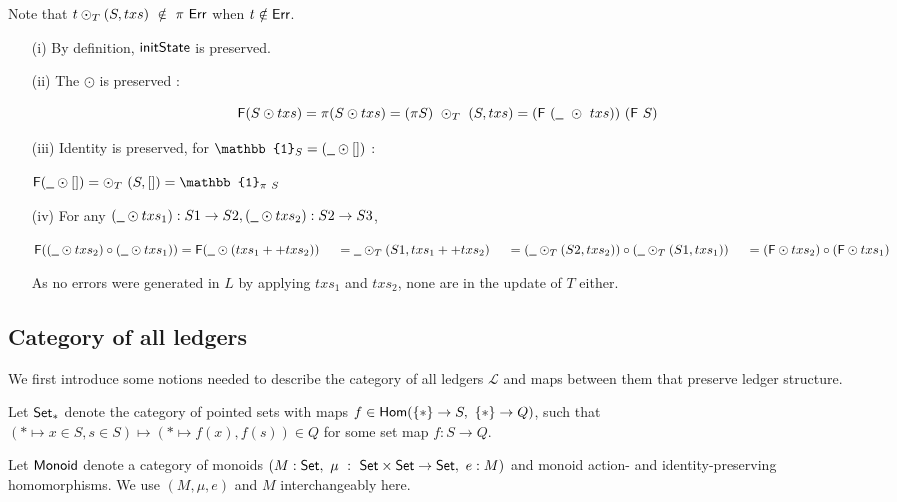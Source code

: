 Note that $t \odot_T (S, txs)~\notin~\pi~\mathsf{Err}$ when $t \notin \mathsf{Err}$.

\begin{itemize}
  \item[(i)] By definition, $\mathsf{initState}$ is preserved.

  \item[(ii)] The $\odot$ is preserved :

 \[ \mathsf{F} (S \odot txs) = \pi (S \odot txs) = (\pi S)~\odot_T~(S, txs) = (\mathsf{F}~(\wcard~\odot~txs))~(\mathsf{F}~S)~ \]

 \item[(iii)] Identity is preserved, for $\mathbb{1}_S = (\wcard \odot [])$ :

 $ \mathsf{F} (\wcard \odot []) = \odot_T~(S, []) = \mathbb{1}_{\pi~S}$ \newline

 \item[(iv)] For any $(\wcard \odot txs_1) : S1 \to S2, (\wcard \odot txs_2) : S2 \to S3$, \newline

 $ \mathsf{F} ((\wcard \odot txs_2) \circ (\wcard \odot txs_1)) = \mathsf{F} (\wcard \odot (txs_1 ++ txs_2)) \\
 ~~~~ = \wcard \odot_T (S1, txs_1 ++ txs_2) \\
 ~~~~ = (\wcard \odot_T (S2, txs_2)) \circ (\wcard \odot_T (S1, txs_1))  \\
 ~~~~ = (\mathsf{F} \odot txs_2) \circ (\mathsf{F} \odot txs_1)$ \newline

 As no errors were generated in $L$ by applying $txs_1$ and $txs_2$, none are in
 the update of $T$ either.
\end{itemize}


\subsection{Category of all ledgers}
\label{sec:all-ledgers}

We first introduce some notions needed to describe the category of all ledgers $\mathcal{L}$
and maps between them that preserve ledger structure.

Let $\mathsf{Set}_{*}$ denote the category of pointed sets with maps $f \in \mathsf{Hom} (\{*\} \to S,~\{*\} \to Q)$,
such that $({*} \mapsto x \in S, s \in S) \mapsto (* \mapsto f(x), f(s)) \in Q$ for some
set map $f : S \to Q$.

Let $\mathsf{Monoid}$ denote a category of monoids $(M : \mathsf{Set},~ \mu~:~ \mathsf{Set} \times \mathsf{Set} \to \mathsf{Set},~ e : M)$
and monoid action- and identity-preserving homomorphisms. We use $(M, \mu, e)$ and $M$
interchangeably here.

